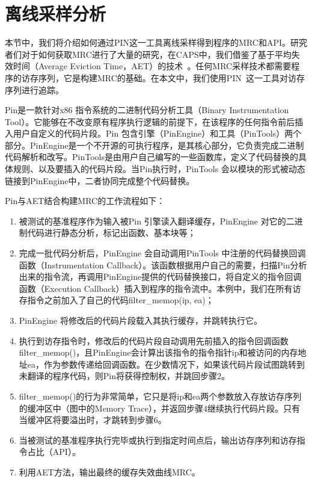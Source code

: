 \section{离线采样分析} \label{sec:prediction_sample}
本节中，我们将介绍如何通过PIN这一工具离线采样得到程序的MRC和API。研究者们对于如何获取MRC进行了大量的研究，在CAPS中，我们借鉴了基于平均失效时间（Average Eviction Time，AET）的技术~\parencite{hu2016kinect}。任何MRC采样技术都需要程序的访存序列，它是构建MRC的基础。在本文中，我们使用PIN~\parencite{luk2005pin}这一工具对访存序列进行追踪。

Pin是一款针对x86 指令系统的二进制代码分析工具（Binary Instrumentation Tool）。它能够在不改变原有程序执行逻辑的前提下，在该程序的任何指令前后插入用户自定义的代码片段。Pin 包含引擎（PinEngine）和工具（PinTools）两个部分。PinEngine是一个不开源的可执行程序，是其核心部分，它负责完成二进制代码解析和改写。PinTools是由用户自己编写的一些函数库，定义了代码替换的具体规则、以及要插入的代码片段。当Pin执行时，PinTools 会以模块的形式被动态链接到PinEngine中，二者协同完成整个代码替换。

Pin与AET结合构建MRC的工作流程如下：
\begin{enumerate}
\item 被测试的基准程序作为输入被Pin 引擎读入翻译缓存，PinEngine 对它的二进制代码进行静态分析，标记出函数、基本块等；
\item 完成一批代码分析后，PinEngine 会自动调用PinTools 中注册的代码替换回调函数（Instrumentation Callback）。该函数根据用户自己的需要，扫描Pin分析出来的指令流，再调用PinEngine提供的代码替换接口，将自定义的指令回调函数（Execution Callback）插入到程序的指令流中。本例中，我们在所有访存指令之前加入了自己的代码filter\_memop(ip, ea)；
\item PinEngine 将修改后的代码片段载入其执行缓存，并跳转执行它。
\item 执行到访存指令时，修改后的代码片段自动调用先前插入的指令回调函数filter\_memop()，且PinEngine会计算出该指令的指令指针ip和被访问的内存地址ea，作为参数传递给回调函数。在少数情况下，如果该代码片段试图跳转到未翻译的程序代码，则Pin将获得控制权，并跳回步骤2。
\item filter\_memop()的行为非常简单，它只是将ip和ea两个参数放入存放访存序列的缓冲区中（图中的Memory Trace），并返回步骤4继续执行代码片段。只有当缓冲区将要溢出时，才跳转到步骤6。
\item 当被测试的基准程序执行完毕或执行到指定时间点后，输出访存序列和访存指令占比（API）。
\item 利用AET方法，输出最终的缓存失效曲线MRC。
\end{enumerate}

